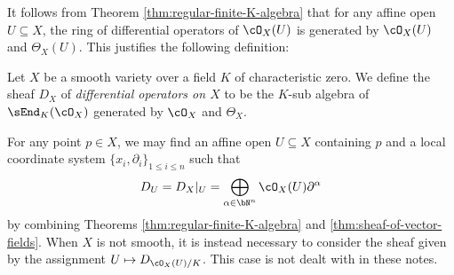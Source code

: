 It follows from Theorem \ref{thm:regular-finite-K-algebra} that for any affine open $U \subseteq X$, the ring of differential operators of $\cO_X(U)$ is generated by $\cO_X(U)$ and $\Theta_X(U)$. This justifies the following definition:
\begin{defn}\label{defn:sheaf-of-differential-operators}
	Let $X$ be a smooth variety over a field $K$ of characteristic zero. We define the sheaf $D_X$ of \emph{differential operators on $X$} to be the $K$-sub algebra of $\sEnd_{K}(\cO_X)$ generated by $\cO_X$ and $\Theta_X$. 
\end{defn}
For any point $p \in X$, we may find an affine open $U \subseteq X$ containing $p$ and a local coordinate system $\{x_i,\partial_i\}_{1\leq i\leq n}$ such that
\begin{align*}
	D_U = D_X|_U = \bigoplus_{\alpha \in \bN^n}\cO_X(U) \partial^{\alpha}
\end{align*}
by combining Theorems \ref{thm:regular-finite-K-algebra} and \ref{thm:sheaf-of-vector-fields}. When $X$ is not smooth, it is instead necessary to consider the sheaf given by the assignment $U \mapsto D_{\cO_X(U)/K}$. This case is not dealt with in these notes.

